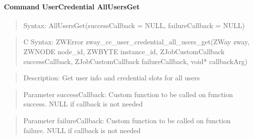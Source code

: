 \paragraph{Command UserCredential AllUsersGet}
\begin{quote}Syntax: AllUsersGet(successCallback = NULL, failureCallback = NULL)\end{quote}
\begin{quote}C Syntax: ZWError zway\_cc\_user\_credential\_all\_users\_get(ZWay zway, ZWNODE node\_id, ZWBYTE instance\_id, ZJobCustomCallback successCallback, ZJobCustomCallback failureCallback, void* callbackArg)\end{quote}
\begin{quote}Description: Get user info and credential slots for all users\end{quote}
\begin{quote}Parameter successCallback: Custom function to be called on function success. NULL if callback is not needed\end{quote}
\begin{quote}Parameter failureCallback: Custom function to be called on function failure. NULL if callback is not needed\end{quote}


